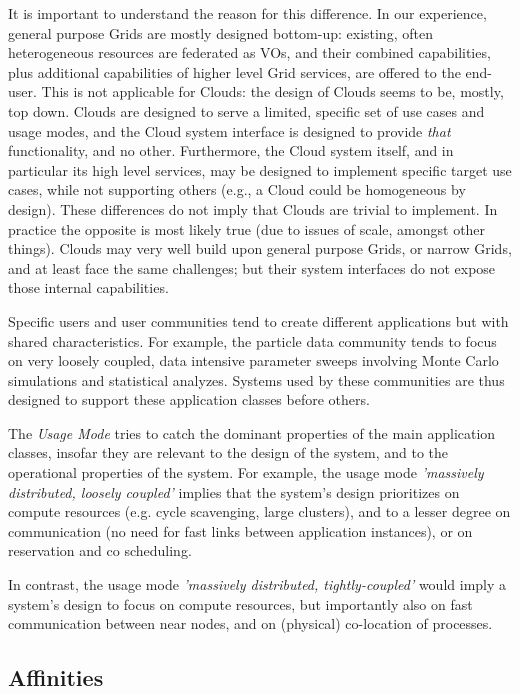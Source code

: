 \documentclass{article}
\newcommand{\I}[1]{\textit{#1}}
\newcommand{\up}{\vspace*{-1em}}
\begin{document}
  It is important to understand the reason for this difference.  In
  our experience, general purpose Grids are mostly designed bottom-up:
  existing, often heterogeneous resources are federated as VOs, and
  their combined capabilities, plus additional capabilities of higher
  level Grid services, are offered to the end-user.  This is not
  applicable for Clouds: the design of Clouds seems to be, mostly, top
  down. Clouds are designed to serve a limited, specific set of use
  cases and usage modes, and the Cloud system interface is designed to
  provide \I{that} functionality, and no other.  Furthermore, the
  Cloud system itself, and in particular its high level services, may
  be designed to implement specific target use cases, while not
  supporting others (e.g., a Cloud could be homogeneous by design).
  These differences do not imply that Clouds are trivial to implement.
  In practice the opposite is most likely true (due to issues of
  scale, amongst other things). Clouds may very well build upon
  general purpose Grids, or narrow Grids, and at least face the same
  challenges; but their system interfaces do not expose those internal
  capabilities.

  Specific users and user communities tend to create different
  applications but with shared characteristics.  For example, the
  particle data community tends to focus on very loosely coupled, data
  intensive parameter sweeps involving Monte Carlo simulations and
  statistical analyzes.  Systems used by these communities are thus
  designed to support these application classes before others.
  
  The \I{Usage Mode} tries to catch the dominant
  properties of the main application classes, insofar they are
  relevant to the design of the system, and to the operational
  properties of the system.  For example, the usage mode \I{'massively
  distributed, loosely coupled'} implies that the system's design
  prioritizes on compute resources (e.g. cycle scavenging, large
  clusters), and to a lesser degree on communication (no need for fast
  links between application instances), or on reservation and co
  scheduling.

  In contrast, the usage mode \I{'massively distributed,
    tightly-coupled'} would imply a system's design to focus on compute
  resources, but importantly also on fast communication between near
  nodes, and on (physical) co-location of processes.


 \up
 \subsection{Affinities}
\end{document}

